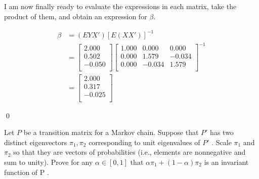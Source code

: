 \documentclass{homework}
\begin{document}
\begin{homeworkProblem}[Problem 2.6]
{\begin{enumerate}[a.]
      I am now finally ready to evaluate the expressions in each matrix, take the product of them, and obtain an expression for $\beta$.

      \begin{align*}
        \beta &= (EYX') [E(XX')]^{-1} \\
          &=
          \begin{bmatrix}
            2.000\\
            0.502\\
            -0.050\\
          \end{bmatrix}
          \begin{bmatrix}
            1.000 & 0.000 & 0.000\\
            0.000 & 1.579 & -0.034\\
            0.000 & -0.034 & 1.579\\
          \end{bmatrix}^{-1} \\
          &=
          \begin{bmatrix}
            2.000\\
            0.317\\
            -0.025\\
          \end{bmatrix}
      \end{align*}
    \end{enumerate}

    
    \qed
  }
\end{homeworkProblem}

\begin{homeworkProblem}[Problem 2.10]

  Let $P$ be a transition matrix for a Markov chain. Suppose that $P'$ has two distinct eigenvectors $\pi_1 , \pi_2$ corresponding to unit eigenvalues of $P'$ . Scale $\pi_1$ and $\pi_2$ so that they are vectors of probabilities (i.e., elements are nonnegative and sum to unity). Prove for any $\alpha \in [0, 1]$ that $\alpha \pi_1 + (1 - \alpha) \pi_2$ is an invariant function of P .

  \vspace{.2in}

\end{homeworkProblem}
\end{document}
